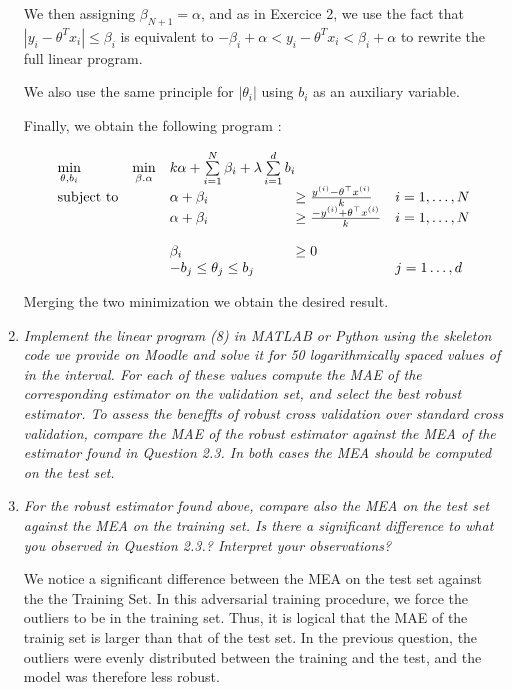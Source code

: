 \documentclass[10pt]{article}
\newenvironment{exercise}[2][Exercise]{\begin{trivlist}
  \item[\hskip \labelsep {\bfseries #1}\hskip \labelsep {\bfseries #2.}]}{\end{trivlist}}
\begin{document}
\begin{exercise}{7}
\begin{enumerate}
We then assigning $\beta_{N+1} = \alpha$, and as in Exercice 2, we use the fact that $|y_i - \theta^T x_i| \leq \beta_i$ is equivalent to $-\beta_i + \alpha < y_i - \theta^T x_i  < \beta_i + \alpha$ to rewrite the full linear program. 

We also use the same principle for $|\theta_i|$ using $b_i$ as an auxiliary variable. 

Finally, we obtain the following program : 

\begin{equation*}
\begin{array}{lll@{}lll}
 \min\limits_{\theta, b_i} &\min\limits_{\beta. \alpha}   &  k\alpha  + \sum\limits_{i=1}^{N}\beta_i  + \lambda\sum\limits_{i=1}^{d} b_i   &\\
\text{subject to} 

&&  \alpha + \beta_i    & \geq \frac{ y^{(i)} - \theta^\top x^{(i)}}{k}&  i=1 ,\dots, N \\
&&  \alpha + \beta_i    & \geq \frac{- y^{(i)} + \theta^\top x^{(i)}}{k} &  i=1 ,\dots, N \\
                \\
                && \beta_i    & \geq 0  & \\ %
                && - b_j \leq \theta_j \leq b_j & & j = 1 \dots, d
\end{array}
\end{equation*}

Merging the two minimization we obtain the desired result. 



\item \textit{Implement the linear program (8) in MATLAB or Python using the skeleton code we provide on Moodle and solve it for 50 logarithmically spaced values of in the interval. For each of these values compute the MAE of the corresponding estimator on the validation set, and select the best robust estimator. To assess the beneffts of robust cross validation over standard cross validation, compare the MAE of the robust estimator against the MEA of the estimator found in Question 2.3. In both cases the MEA should be computed on the test set.}




\item \textit{For the robust estimator found above, compare also the MEA on the test set against the MEA on the training set. Is there a significant difference to what you observed in Question 2.3.? Interpret your observations?}


We notice a significant difference between the MEA on the test set against the the Training Set. In this adversarial training procedure, we force the outliers to be in the training set.  Thus, it is logical that the MAE of the trainig set is larger than that of the test set. In the previous question, the outliers were evenly distributed between the training and the test, and the model was therefore less robust. 


\end{enumerate}

 \end{exercise}
\end{document}
